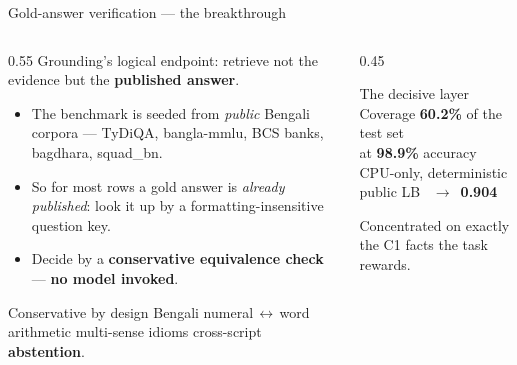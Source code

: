 \documentclass[aspectratio=169,11pt,t]{beamer}
\newcommand{\metric}[1]{{\color{primary}\bfseries #1}}
\newcommand{\good}[1]{{\color{good}\bfseries #1}}
\newcommand{\bad}[1]{{\color{bad}\bfseries #1}}
\begin{document}
\begin{frame}{Gold-answer verification — the breakthrough}
  \begin{columns}[T]
    \begin{column}{0.55\textwidth}
      Grounding's logical endpoint: retrieve not the evidence but the \textbf{published answer}.
      \begin{itemize}\setlength{\itemsep}{0.25em}
        \item The benchmark is seeded from \emph{public} Bengali corpora — TyDiQA, bangla-mmlu, BCS banks, bagdhara, squad\_bn.
        \item So for most rows a gold answer is \emph{already published}: look it up by a formatting-insensitive question key.
        \item Decide by a \textbf{conservative equivalence check} — \textbf{no model invoked}.
      \end{itemize}
      \vspace{-0.6em}
      \begin{block}{Conservative by design}
        \footnotesize Bengali numeral\,$\leftrightarrow$\,word arithmetic \;\textbullet\; multi-sense idioms \;\textbullet\; cross-script \textbf{abstention}.
      \end{block}
    \end{column}
    \begin{column}{0.45\textwidth}
      \centering
      \begin{block}{The decisive layer}
        Coverage \metric{60.2\%} of the test set\\ at \metric{98.9\%} accuracy\\[0.25em]
        CPU-only, deterministic\\[0.45em]
        \large public LB \;\bad{0.815}~$\rightarrow$~\good{0.904}
      \end{block}
      {\footnotesize\color{soft} Concentrated on exactly the C1 facts the task rewards.}
    \end{column}
  \end{columns}
\end{frame}
\end{document}
